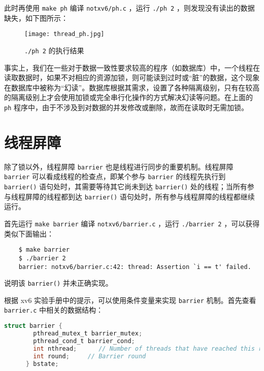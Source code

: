 此时再使用  \lstinline{make ph} 编译 \lstinline{notxv6/ph.c} ，运行 \lstinline{./ph 2} ，则发现没有读出的数据缺失，如下图所示：
\begin{figure}[H]
  \centering
  \texttt{[image: thread\_ph.jpg]}
  \caption{ \lstinline{./ph 2} 的执行结果}
\end{figure}

\begin{proposition}[为何读时不加锁] 
    事实上，我们在一些对于数据一致性要求较高的程序（如数据库）中，一个线程在读取数据时，如果不对相应的资源加锁，则可能读到过时或“脏”的数据，这个现象在数据库中被称为“幻读”。数据库根据其需求，设置了各种隔离级别，只有在较高的隔离级别上才会使用加锁或完全串行化操作的方式解决幻读等问题。在上面的 \lstinline{ph} 程序中，由于不涉及到对数据的并发修改或删除，故而在读取时无需加锁。
\end{proposition}

\section{线程屏障}

除了锁以外，线程屏障 \lstinline{barrier} 也是线程进行同步的重要机制。线程屏障 \lstinline{barrier} 可以看成线程的检查点，即某个参与 \lstinline{barrier} 的线程先执行到 \lstinline{barrier()} 语句处时，其需要等待其它尚未到达 \lstinline{barrier()} 处的线程；当所有参与线程屏障的线程都到达 \lstinline{barrier()} 语句处时，所有参与线程屏障的线程都继续运行。

首先运行 \lstinline{make barrier} 编译 \lstinline{notxv6/barrier.c} ，运行 \lstinline{./barrier 2} ，可以获得类似下面输出：
\begin{lstlisting}
    $ make barrier
    $ ./barrier 2
    barrier: notxv6/barrier.c:42: thread: Assertion `i == t' failed.
\end{lstlisting}
说明该 \lstinline{barrier()} 并未正确实现。

根据 xv6 实验手册中的提示，可以使用条件变量来实现 \lstinline{barrier} 机制。首先查看 \lstinline{barrier.c} 中相关的数据结构：
\begin{lstlisting}[language=C]
    struct barrier {
        pthread_mutex_t barrier_mutex;
        pthread_cond_t barrier_cond;
        int nthread;      // Number of threads that have reached this round of the barrier
        int round;     // Barrier round
      } bstate;
\end{lstlisting}

